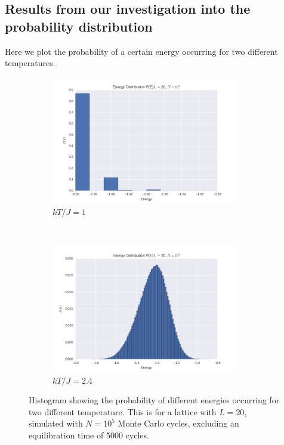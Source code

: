 \documentclass[a4paper, 10pt]{article}
\begin{document}
\subsection{Results from our investigation into the probability distribution}
Here we plot the probability of a certain energy occurring for two different temperatures.
\begin{figure}[!ht]
    \centering
    \begin{subfigure}[H!]{0.5\textwidth}
        \centering
        \includegraphics[height=2.2in]{energyDistHistoT1.png}
        \caption{$kT/J=1$}
    \end{subfigure}%
    ~ 
    \begin{subfigure}[H!]{0.5\textwidth}
        \centering
        \includegraphics[height=2.2in]{energyDistHisto.png}
        \caption{$kT/J=2.4$}
    \end{subfigure}
       \caption{Histogram showing the probability of different energies occurring for two different temperature. This is for a lattice with $L=20$, simulated with $N=10^5$ Monte Carlo cycles, excluding an equilibration time of 5000 cycles. }\label{fig:histograms}
\end{figure}
\end{document}
